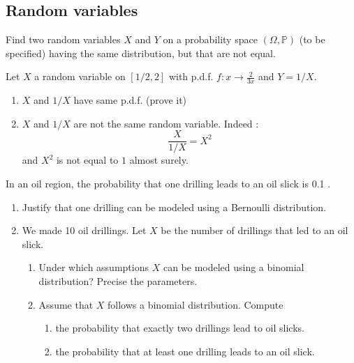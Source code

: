 \begin{center}
  \section*{Random variables}
\end{center}

\begin{Exercise}
  Find two random variables $X$ and $Y$ on a probability space $(\Omega, \mathbb{P})$ (to be specified) having the same distribution, but that are not equal.
\end{Exercise}

\begin{solution}
  Let $X$ a random variable on $[1/2, 2]$ with p.d.f. $f : x \to \frac{2}{3x}$ and $Y = 1/X$.
  \begin{enumerate}
    \item $X$ and $1/X$ have same p.d.f. (prove it)
    \item $X$ and $1/X$ are not the same random variable. Indeed :
          $$\frac{X}{1/X} = X^2$$
          and $X^2$ is not equal to $1$ almost surely.
  \end{enumerate}
\end{solution}

\begin{Exercise}
  In an oil region, the probability that one drilling leads to an oil slick is 0.1 .
  \begin{enumerate}
    \item Justify that one drilling can be modeled using a Bernoulli distribution.
    \item We made 10 oil drillings. Let $X$ be the number of drillings that led to an oil slick.
          \begin{enumerate}
            \item Under which assumptions $X$ can be modeled using a binomial distribution? Precise the parameters.
            \item Assume that $X$ follows a binomial distribution. Compute
                  \begin{enumerate}
                    \item the probability that exactly two drillings lead to oil slicks.
                    \item the probability that at least one drilling leads to an oil slick.
                  \end{enumerate}
          \end{enumerate}
  \end{enumerate}
\end{Exercise}

